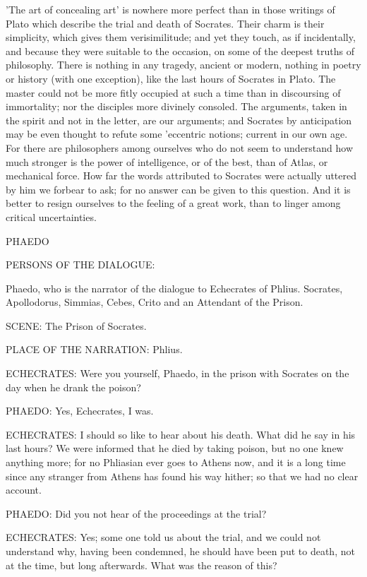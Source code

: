 'The art of concealing art' is nowhere more perfect than in those
writings of Plato which describe the trial and death of Socrates. Their
charm is their simplicity, which gives them verisimilitude; and yet
they touch, as if incidentally, and because they were suitable to the
occasion, on some of the deepest truths of philosophy. There is nothing
in any tragedy, ancient or modern, nothing in poetry or history (with
one exception), like the last hours of Socrates in Plato. The master
could not be more fitly occupied at such a time than in discoursing of
immortality; nor the disciples more divinely consoled. The arguments,
taken in the spirit and not in the letter, are our arguments; and
Socrates by anticipation may be even thought to refute some 'eccentric
notions; current in our own age. For there are philosophers among
ourselves who do not seem to understand how much stronger is the power
of intelligence, or of the best, than of Atlas, or mechanical force.
How far the words attributed to Socrates were actually uttered by him we
forbear to ask; for no answer can be given to this question. And it
is better to resign ourselves to the feeling of a great work, than to
linger among critical uncertainties.




PHAEDO


PERSONS OF THE DIALOGUE:

Phaedo, who is the narrator of the dialogue to Echecrates of Phlius.
Socrates, Apollodorus, Simmias, Cebes, Crito and an Attendant of the
Prison.

SCENE: The Prison of Socrates.

PLACE OF THE NARRATION: Phlius.



ECHECRATES: Were you yourself, Phaedo, in the prison with Socrates on
the day when he drank the poison?

PHAEDO: Yes, Echecrates, I was.

ECHECRATES: I should so like to hear about his death. What did he say in
his last hours? We were informed that he died by taking poison, but no
one knew anything more; for no Phliasian ever goes to Athens now, and it
is a long time since any stranger from Athens has found his way hither;
so that we had no clear account.

PHAEDO: Did you not hear of the proceedings at the trial?

ECHECRATES: Yes; some one told us about the trial, and we could not
understand why, having been condemned, he should have been put to death,
not at the time, but long afterwards. What was the reason of this?

